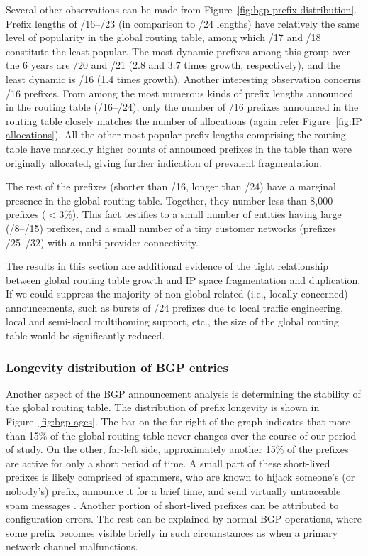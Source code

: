 Several other observations can be made from Figure~\ref{fig:bgp prefix
distribution}. Prefix lengths of /16--/23 (in comparison to /24 lengths) have
relatively the same level of popularity in the global routing table, among
which /17 and /18 constitute the least popular. The most dynamic prefixes among
this group over the 6 years are /20 and /21 (2.8 and 3.7 times growth,
respectively), and the least dynamic is /16 (1.4 times growth). Another
interesting observation concerns /16 prefixes. From among the most numerous
kinds of prefix lengths announced in the routing table (/16--/24), only the
number of /16 prefixes announced in the routing table closely matches the
number of allocations (again refer Figure~\ref{fig:IP allocations}). All the
other most popular prefix lengths comprising the routing table have markedly
higher counts of announced prefixes in the table than were originally
allocated, giving further indication of prevalent fragmentation.

The rest of the prefixes (shorter than /16, longer than /24) have a marginal
presence in the global routing table.  Together, they number less than 8,000
prefixes ($<$3\%). This fact testifies to a small number of entities having large
(/8--/15) prefixes, and a small number of a tiny customer networks (prefixes
/25--/32) with a multi-provider connectivity.

The results in this section are additional evidence of the tight relationship
between global routing table growth and IP space fragmentation and duplication.
If we could suppress the majority of non-global related (i.e., locally
concerned) announcements, such as bursts of /24 prefixes due to local traffic
engineering, local and semi-local multihoming support, etc., the size of the
global routing table would be significantly reduced.

\subsubsection{Longevity distribution of BGP entries}

Another aspect of the BGP announcement analysis is determining the stability of
the global routing table. The distribution of prefix longevity is shown in
Figure~\ref{fig:bgp ages}. The bar on the far right of the graph indicates that
more than 15\% of the global routing table never changes over the course of our
period of study. On the other, far-left side, approximately another 15\% of the
prefixes
 are active for only a short period of time. A small part of these
short-lived prefixes is likely comprised of spammers, who are known to hijack
someone's (or nobody's) prefix, announce it for a brief time, and send
virtually untraceable spam messages
\cite{Ramachandran:2006:Understanding-the-network-level}. Another portion of
short-lived prefixes can be attributed to configuration errors. The rest can be
explained by normal BGP operations, where some prefix becomes visible briefly
in such circumstances as when a primary network channel malfunctions.

